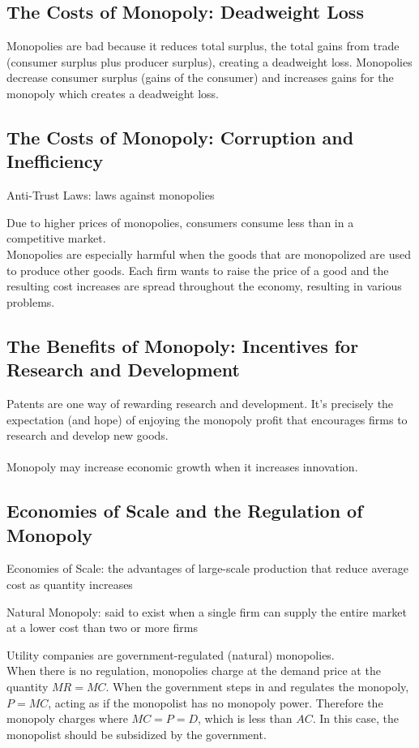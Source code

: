 \documentclass[12pt]{article}
\begin{document}
\subsection{The Costs of Monopoly: Deadweight Loss}
Monopolies are bad because it reduces total surplus, the total gains from trade (consumer surplus plus producer surplus), creating a deadweight loss. Monopolies decrease consumer surplus (gains of the consumer) and increases gains for the monopoly which creates a deadweight loss. 

\subsection{The Costs of Monopoly: Corruption and Inefficiency} 
\begin{definition} Anti-Trust Laws: laws against monopolies \end{definition} 
Due to higher prices of monopolies, consumers consume less than in a competitive market. \\ 
Monopolies are especially harmful when the goods that are monopolized are used to produce other goods. Each firm wants to raise the price of a good and the resulting cost increases are spread throughout the economy, resulting in various problems. 

\subsection{The Benefits of Monopoly: Incentives for Research and Development}
Patents are one way of rewarding research and development. It's precisely the expectation (and hope) of enjoying the monopoly profit that encourages firms to research and develop new goods. \\~\\
Monopoly may increase economic growth when it increases innovation. 

\subsection{Economies of Scale and the Regulation of Monopoly}
\begin{definition} Economies of Scale: the advantages of large-scale production that reduce average cost as quantity increases \end{definition}
\begin{definition} Natural Monopoly: said to exist when a single firm can supply the entire market at a lower cost than two or more firms \end{definition}
Utility companies are government-regulated (natural) monopolies. \\
When there is no regulation, monopolies charge at the demand price at the quantity $MR = MC$. When the government steps in and regulates the monopoly, $P = MC$, acting as if the monopolist has no monopoly power. Therefore the monopoly charges where $MC = P = D$, which is less than $AC$. In this case, the monopolist should be subsidized by the government.  \newpage
\end{document}

